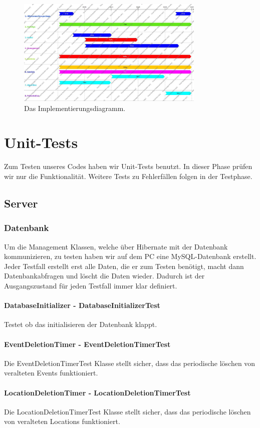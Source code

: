 \documentclass{scrartcl}
\begin{document}
	\begin{figure}[h]
		\centering
		\includegraphics[width=0.8\textwidth]{ImplementationDiagram.jpg}
		\caption{Das Implementierungsdiagramm.}
	\end{figure}
	
	\newpage
	\section{Unit-Tests}
	Zum Testen unseres Codes haben wir Unit-Tests benutzt. In dieser Phase prüfen wir nur die Funktionalität. Weitere Tests zu Fehlerfällen folgen in der Testphase.
	\subsection{Server}
	\subsubsection{Datenbank}
	Um die Management Klassen, welche über Hibernate mit der Datenbank kommunizieren, zu testen haben wir auf dem PC eine MySQL-Datenbank erstellt. Jeder Testfall erstellt erst alle Daten, die er zum Testen benötigt, macht dann Datenbankabfragen und löscht die Daten wieder. Dadurch ist der Ausgangszustand für jeden Testfall immer klar definiert.
	\paragraph{DatabaseInitializer - DatabaseInitializerTest}	
	Testet ob das initialisieren der Datenbank klappt.
	\paragraph{EventDeletionTimer - EventDeletionTimerTest}	
	Die	EventDeletionTimerTest Klasse stellt sicher, dass das periodische löschen von veralteten Events funktioniert.
		\paragraph{LocationDeletionTimer - LocationDeletionTimerTest}	
	Die	LocationDeletionTimerTest Klasse stellt sicher, dass das periodische löschen von veralteten Locations funktioniert.
\end{document}
